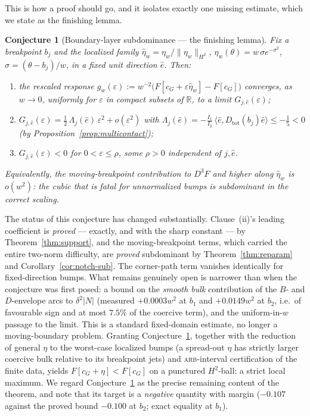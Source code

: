 \documentclass[11pt]{amsart}
\theoremstyle{plain}
\newtheorem{conjecture}[theorem]{Conjecture}
\theoremstyle{definition}
\newcommand{\R}{\mathbb{R}}
\newcommand{\cG}{c_{G}}
\begin{document}
This is how a proof should go, and it isolates exactly one missing
estimate, which we state as the finishing lemma.

\begin{conjecture}[Boundary-layer subdominance --- the finishing lemma]
\label{conj:subdominance}
Fix a breakpoint $b_{j}$ and the localized family
$\hat\eta_{w}=\eta_{w}/\|\eta_{w}\|_{H^{2}}$,
$\eta_{w}(\theta)=w\,\sigma e^{-\sigma^{2}}$, $\sigma=(\theta-b_{j})/w$,
in a fixed unit direction $\hat e$.  Then:
\begin{enumerate}
\item[(i)] the rescaled response
$g_{w}(\varepsilon):=w^{-2}\bigl(F[\cG+\varepsilon\hat\eta_{w}]-F[\cG]\bigr)$
converges, as $w\to0$, uniformly for $\varepsilon$ in compact
subsets of $\R$, to a limit $G_{j,\hat e}(\varepsilon)$;
\item[(ii)] $G_{j,\hat e}(\varepsilon)
= \tfrac12\,\Lambda_{j}(\hat e)\,\varepsilon^{2}+o(\varepsilon^{2})$
with $\Lambda_{j}(\hat e)
= -\tfrac{I_{1}}{I_{2}}\,\langle\hat e,D_{\mathrm{tot}}(b_{j})\hat e\rangle
\leq -\tfrac15<0$ (by Proposition~\ref{prop:multicontact});
\item[(iii)] $G_{j,\hat e}(\varepsilon)<0$ for
$0<\varepsilon\leq\rho$, some $\rho>0$ independent of $j,\hat e$.
\end{enumerate}
Equivalently, the moving-breakpoint contribution to $D^{3}F$ and higher
along $\hat\eta_{w}$ is $o(w^{2})$: the cubic that is fatal for
unnormalized bumps is subdominant in the correct scaling.
\end{conjecture}

The status of this conjecture has changed substantially.  Clause~(ii)'s
leading coefficient is \emph{proved} --- exactly, and with the sharp
constant --- by Theorem~\ref{thm:support}, and the
moving-breakpoint terms, which carried the entire two-norm difficulty,
are \emph{proved} subdominant by Theorem~\ref{thm:reparam} and
Corollary~\ref{cor:notch-sub}.  The corner-path term vanishes
identically for fixed-direction bumps.  What remains genuinely open is
narrower than when the conjecture was first posed: a bound on the
\emph{smooth bulk} contribution of the $B$- and $D$-envelope arcs to
$\delta^{2}|N|$ (measured $+0.0003w^{2}$ at $b_{1}$ and $+0.0149w^{2}$
at $b_{2}$, i.e.\ of favourable sign and at most $7.5\%$ of the coercive
term), and the uniform-in-$w$ passage to the limit.  This is a standard
fixed-domain estimate, no longer a moving-boundary problem.
Granting Conjecture~\ref{conj:subdominance}, together with the reduction
of general $\eta$ to the worst-case localized bumps (a spread-out $\eta$
has strictly larger coercive bulk relative to its breakpoint jets) and
\textsc{arb}-interval certification of the finite data, yields
$F[\cG+\eta]<F[\cG]$ on a punctured $H^{2}$-ball: a strict local maximum.
We regard Conjecture~\ref{conj:subdominance} as the precise remaining
content of the theorem, and note that its target is a \emph{negative}
quantity with margin ($-0.107$ against the proved bound $-0.100$ at
$b_{2}$; exact equality at $b_{1}$).
\end{document}
